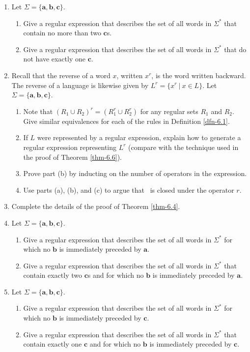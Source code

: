 \begin{enumerate}[{6.}1.]
\item Let $\Sigma=\{\pmb{a},\pmb{b},\pmb{c}\}$.
\begin{enumerate}
\item Give a regular expression that describes the set of all words in $\Sigma^*$
that contain no more than two $\pmb{c}$s.
\item Give a regular expression that describes the set of all words in $\Sigma^*$
that do not have exactly one $\pmb{c}$.
\end{enumerate}

\item Recall that the reverse of a word $x$, written $x^r$, is the word written
backward. The reverse of a language is likewise given by $L^r=\{x^r\ |\ x \in L\}$.
Let $\Sigma=\{\pmb{a},\pmb{b},\pmb{c}\}$.
\begin{enumerate}
\item Note that $(R_1 \cup R_2)^r = (R^r_1 \cup R^r_2)$ for any regular sets $R_1$
and $R_2$. Give similar equivalences for each of the rules in Definition \ref{dfn-6.1}.
\item If $L$ were represented by a regular expression, explain how to generate a
regular expression representing $L^r$ (compare with the technique used in the
proof of Theorem \ref{thm-6.6}).
\item Prove part (b) by inducting on the number of operators in the expression.
\item Use parts (a), (b), and (c) to argue that \RSIG\ is closed under the
operator $r$.
\end{enumerate}

\item Complete the details of the proof of Theorem \ref{thm-6.4}.

\item Let $\Sigma=\{\pmb{a},\pmb{b},\pmb{c}\}$.
\begin{enumerate}
\item Give a regular expression that describes the set of all words in $\Sigma^*$
for which no $\pmb{b}$ is immediately preceded by $\pmb{a}$.
\item Give a regular expression that describes the set of all words in $\Sigma^*$
that contain exactly two $\pmb{c}$s and for which no $\pmb{b}$ is immediately
preceded by $\pmb{a}$.
\end{enumerate}

\item Let $\Sigma=\{\pmb{a},\pmb{b},\pmb{c}\}$.
\begin{enumerate}
\item Give a regular expression that describes the set of all words in $\Sigma^*$
for which no $\pmb{b}$ is immediately preceded by $\pmb{c}$.
\item Give a regular expression that describes the set of all words in $\Sigma^*$
that contain exactly one $\pmb{c}$ and for which no $\pmb{b}$ is immediately
preceded by $\pmb{c}$.
\end{enumerate}


\end{enumerate}

